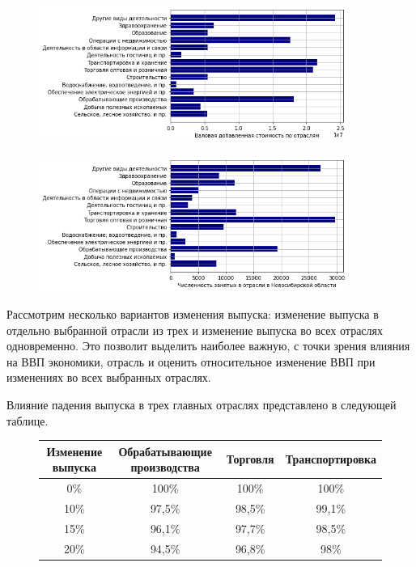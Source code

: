 \documentclass[12pt, a4paper]{article}
\begin{document}
\begin{figure}[h]
\includegraphics[width=0.9\textwidth]{pictures/VDS.png}
\end{figure}

\begin{figure}[h]
\includegraphics[width=0.9\textwidth]{pictures/labour.png}
\end{figure}
Рассмотрим несколько вариантов изменения выпуска: изменение выпуска в отдельно выбранной отрасли из трех и изменение выпуска во всех отраслях одновременно. Это позволит выделить наиболее важную, с точки зрения влияния на ВВП экономики, отрасль и оценить относительное изменение ВВП при изменениях во всех выбранных отраслях.

Влияние падения выпуска в трех главных отраслях представлено в следующей таблице.

\begin{figure}[h]
\begin{tabular}{|c|c|c|c|}
\hline
Изменение выпуска & Обрабатывающие производства & Торговля & Транспортировка\\
\hline
0\% & 100\% & 100\% & 100\%\\
10\% & 97,5\% &98,5\% & 99,1\%\\
15\% & 96,1\%& 97,7\%& 98,5\%\\
20\% & 94,5\%& 96,8\%& 98\%\\
\hline
\end{tabular}

\end{figure}
\end{document}
